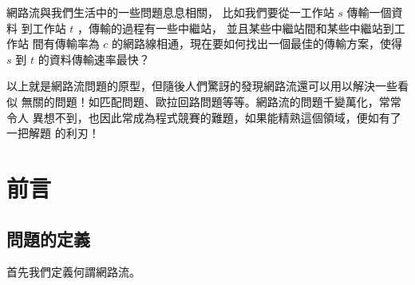 \documentclass[a4paper,12pt]{book}
\begin{document}
\newcommand{\str}[1]{\texttt{"#1"}}
\newcommand{\mcstr}[2]{\texttt{"#1}\cdots\texttt{#2"}}
\newcommand{\ord}[1]{\opord\left(#1\right)}
\newcommand{\abs}[1]{\lvert #1 \rvert}
\newcommand{\floor}[1]{\lfloor #1 \rfloor}
\newcommand{\ceil}[1]{\lceil #1 \rceil}
\newcommand{\opord}{\operatorname{\mathcal{O}}}
\newcommand{\fail}{\operatorname{\mathcal{F}}}
\newcommand{\flk}{\operatorname{\mathfrak{F}}}
\newcommand{\suf}{\operatorname{\sigma}}
\newcommand{\rank}{\operatorname{\mathcal{R}}}
\newcommand{\sa}{\operatorname{\mathcal{SA}}}
\newcommand{\hei}{\operatorname{\mathcal{H}}}
\newcommand{\edps}{\operatorname{\mathcal{E}}}
\newcommand{\mx}{\operatorname{\mathcal{M}}}
\newcommand{\argmax}{\operatorname{arg\,max}}
\newcommand{\cons}[1]{\left[ \: #1 \: \right]}

\newcommand\numbereqn{\addtocounter{equation}{1}\tag{\theequation}}
\newcommand\listeqn{\hfill\refstepcounter{equation}(\theequation)}
\newenvironment{monobox}{\linespread{0.6}\Verbatim[frame=single, commandchars=\\\{\}]}{\endVerbatim}
\makeatletter


\begin{comment}
  # Definition
  # Maximum s-t Flow algorithms
  # Models
  # Minimum Cost Maximum Flow algorithms
  # Models
  # Feasible flow
  # Models
  # Advanced topic and misc
\end{comment}

網路流與我們生活中的一些問題息息相關， 比如我們要從一工作站 $s$ 傳輸一個資料
到工作站 $t$ ，傳輸的過程有一些中繼站， 並且某些中繼站間和某些中繼站到工作站
間有傳輸率為 $c$ 的網路線相通，現在要如何找出一個最佳的傳輸方案，使得 $s$ 
到 $t$ 的資料傳輸速率最快？ 

以上就是網路流問題的原型，但隨後人們驚訝的發現網路流還可以用以解決一些看似
無關的問題！如匹配問題、歐拉回路問題等等。網路流的問題千變萬化，常常令人
異想不到，也因此常成為程式競賽的難題，如果能精熟這個領域，便如有了一把解題
的利刃！

\section{前言}

\subsection{問題的定義}
首先我們定義何謂網路流。
\end{document}
